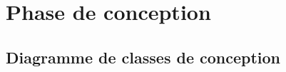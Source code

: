 \section[Phase de conception]{Phase de conception}
    \subsection[Diagramme de classes de conception]{Diagramme de classes de conception}
    